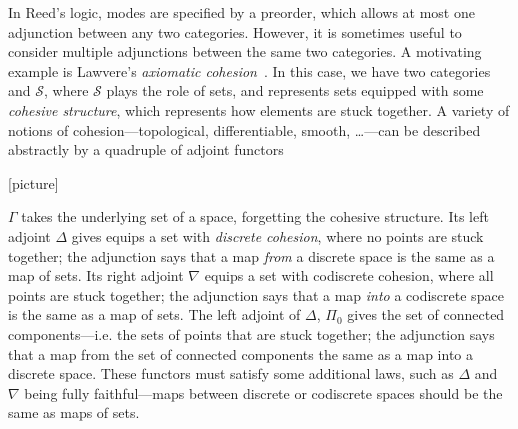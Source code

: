 \documentclass{drl-common/llncs}
\begin{document}
In Reed's logic, modes are specified by a preorder, which allows at most
one adjunction between any two categories.  However, it is sometimes
useful to consider multiple adjunctions between the same two categories.
A motivating example is Lawvere's \emph{axiomatic
  cohesion}~\citep{lawvereXXcohesion}.  In this case, we have two
categories \C and $\mathcal{S}$, where $\mathcal{S}$ plays the role of
sets, and \C represents sets equipped with some \emph{cohesive
  structure}, which represents how elements are stuck together.  A
variety of notions of cohesion---topological, differentiable, smooth,
\ldots---can be described abstractly by a quadruple of adjoint functors

[picture]

\noindent $\Gamma$ takes the underlying set of a space, forgetting the
cohesive structure.  Its left adjoint $\Delta$ gives equips a set with
\emph{discrete cohesion}, where no points are stuck together; the
adjunction says that a map \emph{from} a discrete space is the same as a
map of sets.  Its right adjoint $\nabla$ equips a set with codiscrete
cohesion, where all points are stuck together; the adjunction says that
a map \emph{into} a codiscrete space is the same as a map of sets.  The
left adjoint of $\Delta$, $\Pi_0$ gives the set of connected
components---i.e. the sets of points that are stuck together; the
adjunction says that a map from the set of connected components the same
as a map into a discrete space.  These functors must satisfy some
additional laws, such as $\Delta$ and $\nabla$ being fully
faithful---maps between discrete or codiscrete spaces should be the same
as maps of sets.
\end{document}
